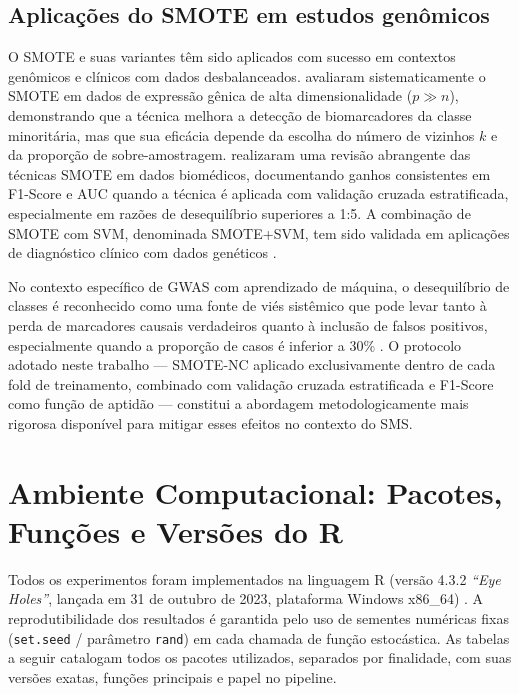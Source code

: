 \documentclass[
    12pt,
    a4paper,
    oneside,
    english,
    french,
    spanish,
    brazil
    ]{abntex2}
\newcommand{\novo}[1]{\textcolor{corNova}{#1}}
\begin{document}
\subsection*{Aplicações do SMOTE em estudos genômicos}

\novo{O SMOTE e suas variantes têm sido aplicados com sucesso em contextos genômicos e clínicos com dados desbalanceados. \citeonline{blagus2013smote} avaliaram sistematicamente o SMOTE em dados de expressão gênica de alta dimensionalidade ($p \gg n$), demonstrando que a técnica melhora a detecção de biomarcadores da classe minoritária, mas que sua eficácia depende da escolha do número de vizinhos $k$ e da proporção de sobre-amostragem. \citeonline{fotouhi2019comprehensive} realizaram uma revisão abrangente das técnicas SMOTE em dados biomédicos, documentando ganhos consistentes em F1-Score e AUC quando a técnica é aplicada com validação cruzada estratificada, especialmente em razões de desequilíbrio superiores a 1:5. A combinação de SMOTE com SVM, denominada SMOTE+SVM, tem sido validada em aplicações de diagnóstico clínico com dados genéticos \cite{vuttipittayamongkol2021neighbourhood}.}

\novo{No contexto específico de GWAS com aprendizado de máquina, o desequilíbrio de classes é reconhecido como uma fonte de viés sistêmico que pode levar tanto à perda de marcadores causais verdadeiros quanto à inclusão de falsos positivos, especialmente quando a proporção de casos é inferior a 30\% \cite{krawczyk2016}. O protocolo adotado neste trabalho --- SMOTE-NC aplicado exclusivamente dentro de cada fold de treinamento, combinado com validação cruzada estratificada e F1-Score como função de aptidão --- constitui a abordagem metodologicamente mais rigorosa disponível para mitigar esses efeitos no contexto do SMS.}

\section*{Ambiente Computacional: Pacotes, Funções e Versões do R}
\label{sec:pacotes_r}

\novo{Todos os experimentos foram implementados na linguagem R (versão 4.3.2 \textit{``Eye Holes''}, lançada em 31 de outubro de 2023, plataforma Windows x86\_64) \cite{Team2013}. A reprodutibilidade dos resultados é garantida pelo uso de sementes numéricas fixas (\texttt{set.seed} / parâmetro \texttt{rand}) em cada chamada de função estocástica. As tabelas a seguir catalogam todos os pacotes utilizados, separados por finalidade, com suas versões exatas, funções principais e papel no pipeline.}
\end{document}
